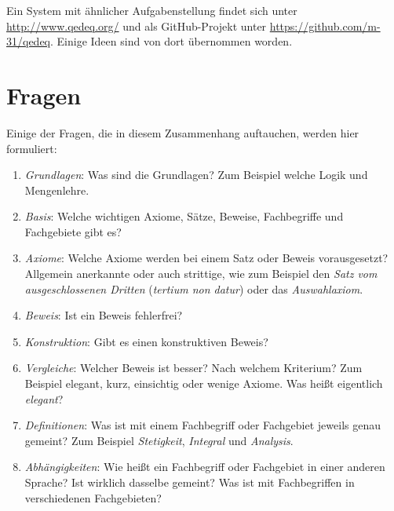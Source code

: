 \documentclass[english,ngerman,parskip=half,headsepline,footsepline]{scrreprt}
\begin{document}
	Ein System mit ähnlicher Aufgabenstellung findet sich unter \url{http://www.qedeq.org/} und als GitHub-Projekt unter \url{https://github.com/m-31/qedeq}. Einige Ideen sind von dort übernommen worden.
	
	\section{Fragen}
	\label{sec:Fragen}
	Einige der Fragen, die in diesem Zusammenhang auftauchen, werden hier formuliert:
	
	\begin{enumerate}
		
		\item \label{Frage:Grundlagen} \emph{Grundlagen}: Was sind die Grundlagen? Zum Beispiel welche Logik und Mengenlehre.
		
		\item \label{Frage:Basis} \emph{Basis}: Welche wichtigen Axiome, Sätze, Beweise, Fachbegriffe und Fachgebiete gibt es?
		
		\item \label{Frage:Axiome} \emph{Axiome}: Welche Axiome werden bei einem Satz oder Beweis vorausgesetzt? Allgemein anerkannte oder auch strittige, wie zum Beispiel den \emph{Satz vom ausgeschlossenen Dritten} (\emph{tertium non datur}) oder das \emph{Auswahlaxiom}.
		
		\item \label{Frage:Beweis} \emph{Beweis}: Ist ein Beweis fehlerfrei?
		
		\item \label{Frage:Konstruktion} \emph{Konstruktion}: Gibt es einen konstruktiven Beweis?
		
		\item \label{Frage:Vergleiche} \emph{Vergleiche}: Welcher Beweis ist besser? Nach welchem Kriterium? Zum Beispiel elegant, kurz, einsichtig oder wenige Axiome. Was heißt eigentlich \emph{elegant}?
		
		\item \label{Frage:Definitionen} \emph{Definitionen}: Was ist mit einem Fachbegriff oder Fachgebiet jeweils genau gemeint? Zum Beispiel \emph{Stetigkeit}, \emph{Integral} und \emph{Analysis}.
		
		\item \label{Frage:Abhängigkeiten} \emph{Abhängigkeiten}: Wie heißt ein Fachbegriff oder Fachgebiet in einer anderen Sprache? Ist wirklich dasselbe gemeint? Was ist mit Fachbegriffen in verschiedenen Fachgebieten?
		

\end{enumerate}
\end{document}
